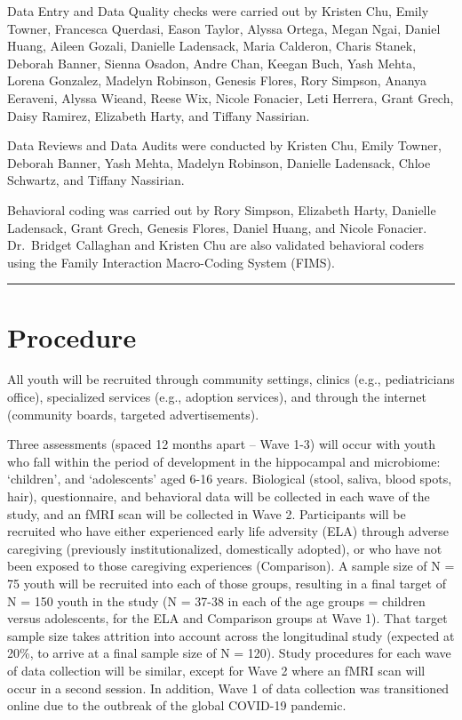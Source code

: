 \documentclass[
]{book}
\begin{document}
Data Entry and Data Quality checks were carried out by Kristen Chu, Emily Towner, Francesca Querdasi, Eason Taylor, Alyssa Ortega, Megan Ngai, Daniel Huang, Aileen Gozali, Danielle Ladensack, Maria Calderon, Charis Stanek, Deborah Banner, Sienna Osadon, Andre Chan, Keegan Buch, Yash Mehta, Lorena Gonzalez, Madelyn Robinson, Genesis Flores, Rory Simpson, Ananya Eeraveni, Alyssa Wieand, Reese Wix, Nicole Fonacier, Leti Herrera, Grant Grech, Daisy Ramirez, Elizabeth Harty, and Tiffany Nassirian.

Data Reviews and Data Audits were conducted by Kristen Chu, Emily Towner, Deborah Banner, Yash Mehta, Madelyn Robinson, Danielle Ladensack, Chloe Schwartz, and Tiffany Nassirian.

Behavioral coding was carried out by Rory Simpson, Elizabeth Harty, Danielle Ladensack, Grant Grech, Genesis Flores, Daniel Huang, and Nicole Fonacier. Dr.~Bridget Callaghan and Kristen Chu are also validated behavioral coders using the Family Interaction Macro-Coding System (FIMS).

\begin{center}\rule{0.5\linewidth}{0.5pt}\end{center}

\hypertarget{procedure}{%
\section{Procedure}\label{procedure}}

All youth will be recruited through community settings, clinics (e.g., pediatricians office), specialized services (e.g., adoption services), and through the internet (community boards, targeted advertisements).

Three assessments (spaced 12 months apart -- Wave 1-3) will occur with youth who fall within the period of development in the hippocampal and microbiome: `children', and `adolescents' aged 6-16 years. Biological (stool, saliva, blood spots, hair), questionnaire, and behavioral data will be collected in each wave of the study, and an fMRI scan will be collected in Wave 2. Participants will be recruited who have either experienced early life adversity (ELA) through adverse caregiving (previously institutionalized, domestically adopted), or who have not been exposed to those caregiving experiences (Comparison). A sample size of N = 75 youth will be recruited into each of those groups, resulting in a final target of N = 150 youth in the study (N = 37-38 in each of the age groups = children versus adolescents, for the ELA and Comparison groups at Wave 1). That target sample size takes attrition into account across the longitudinal study (expected at 20\%, to arrive at a final sample size of N = 120). Study procedures for each wave of data collection will be similar, except for Wave 2 where an fMRI scan will occur in a second session. In addition, Wave 1 of data collection was transitioned online due to the outbreak of the global COVID-19 pandemic.
\end{document}
